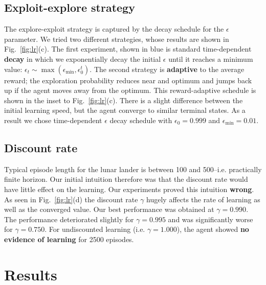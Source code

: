 \documentclass[conference]{IEEEtran}
\begin{document}
\subsection{Exploit-explore strategy}
The explore-exploit strategy is captured by the decay schedule for the $\epsilon$ parameter. We tried two different strategies, whose results are shown in Fig.~\ref{fig:lr}(c). The first experiment, shown in blue is standard time-dependent {\bf decay} in which we exponentially decay the initial $\epsilon$ until it reaches a minimum value:  $\epsilon_t \sim \max(\epsilon_{\text{min}}, \epsilon_0^t)$. The second strategy is {\bf adaptive} to the average reward; the exploration probability reduces near and optimum and jumps back up if the agent moves away from the optimum. This reward-adaptive schedule is shown in the inset to Fig.~\ref{fig:lr}(c). There is a slight difference between the initial learning speed, but the agent converge to similar terminal states. As a result we chose time-dependent $\epsilon$ decay schedule with $\epsilon_0=0.999$ and $\epsilon_{\text{min}}=0.01$.
\subsection{Discount rate}
Typical episode length for the lunar lander is between 100 and 500--i.e. practically finite horizon. Our initial intuition therefore was that the discount rate would have little effect on the learning. Our experiments proved this intuition {\bf wrong}. As seen in Fig.~\ref{fig:lr}(d) the discount rate $\gamma$ hugely affects the rate of learning as well as the converged value. Our best performance was obtained at $\gamma = 0.990$. The performance deteriorated slightly for $\gamma = 0.995$ and was significantly worse for $\gamma = 0.750$. For undiscounted learning (i.e. $\gamma = 1.000$), the agent showed {\bf no evidence of learning} for 2500 episodes.
\section{Results}
\end{document}
